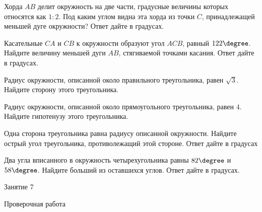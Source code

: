 \begin{homework}[number=3]
	\begin{listofex}
		\item Хорда \( AB \) делит окружность на две части, градусные величины которых относятся как \( 1:2 \). Под каким углом видна эта хорда из точки \( C \), принадлежащей меньшей дуге окружности? Ответ дайте в градусах.
		\item Касательные \( CA \) и \( CB \) к окружности образуют угол \( ACB \), равный \( 122\degree \). Найдите величину меньшей дуги \( AB \), стягиваемой точками касания. Ответ дайте в градусах.
		\item Радиус окружности, описанной около правильного треугольника, равен \( \sqrt{3} \). Найдите сторону этого треугольника.
		\item Радиус окружности, описанной около прямоугольного треугольника, равен \( 4 \). Найдите гипотенузу этого треугольника.
		\item Одна сторона треугольника равна радиусу описанной окружности. Найдите острый угол треугольника, противолежащий этой стороне. Ответ дайте в градусах
		\item Два угла вписанного в окружность четырехугольника равны \( 82\degree\) и \( 58\degree \). Найдите больший из оставшихся углов. Ответ дайте в градусах.
	\end{listofex}
\end{homework}

\begin{class}[number=7]
	\begin{listofex}
		\item Занятие 7
	\end{listofex}
\end{class}

\begin{exam}
	\begin{listofex}
		\item Проверочная работа
	\end{listofex}
\end{exam}
